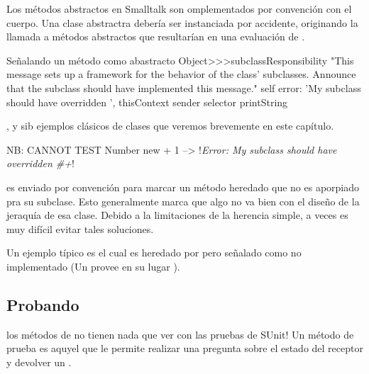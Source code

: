 \documentclass[a4paper,10pt,twoside]{book}
\begin{document}

Los m\'etodos abstractos en Smalltalk son omplementados por convenci\'on con el cuerpo. Una clase abstractra deber\'ia ser instanciada por accidente, originando la llamada a m\'etodos abstractos que resultar\'ian en una evaluaci\'on de  .

\begin{method}{Señalando un m\'etodo como abastracto}
Object>>>subclassResponsibility
    "This message sets up a framework for the behavior of the class' subclasses.
    Announce that the subclass should have implemented this message."
    self error: 'My subclass should have overridden ', thisContext sender selector printString
\end{method}

,  y  sib ejemplos cl\'asicos de clases  que veremos brevemente en este cap\'itulo.

\begin{code}{NB: CANNOT TEST}
Number new + 1 --> !\emph{Error: My subclass should have overridden \#+}!
\end{code}

 es enviado por convenci\'on para marcar un m\'etodo heredado que no es aporpiado pra su subclase. Esto generalmente marca que algo no va bien con el diseño de la jeraqu\'ia de esa clase. Debido a la limitaciones de la herencia simple, a veces es muy dif\'icil evitar tales soluciones. 


Un ejemplo t\'ipico es  el cual es heredado por   pero señalado como no implementado (Un  provee en su lugar ).

\subsection{Probando}

los m\'etodos de  no tienen nada que ver con las pruebas de  SUnit! Un m\'etodo de prueba es aquyel que le permite realizar una pregunta sobre el estado del receptor y devolver un .
\end{document}
